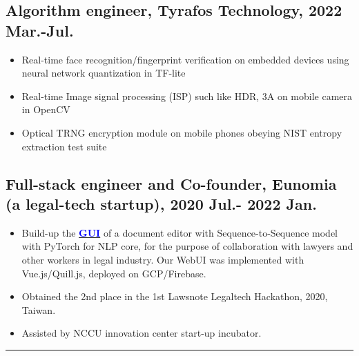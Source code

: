 \documentclass[11pt]{article}
\begin{document}
\begin{multicols*}{2}
\begin{experiencebox}
\vspace{0.3em}

\subsection*{\textbf{Algorithm engineer}, Tyrafos Technology, 2022 Mar.-Jul.}
\begin{itemize}[noitemsep]
    \item Real-time face recognition/fingerprint verification on embedded devices using neural network quantization in TF-lite
    \item Real-time Image signal processing (ISP) such like HDR, 3A on mobile camera in OpenCV
    \item Optical TRNG encryption module on mobile phones obeying NIST entropy extraction test suite
\end{itemize}

\vspace{0.3em}

\subsection*{Full-stack engineer and Co-founder, Eunomia (a legal-tech startup), 2020 Jul.- 2022 Jan.}
\begin{itemize}[noitemsep]
    \item Build-up the \href{https://github.com/Kuo-TingKai/Eunomia}{\textbf{\textcolor{blue}{GUI}}} of a document editor with Sequence-to-Sequence model with PyTorch for NLP core, for the purpose of collaboration with lawyers and other workers in legal industry. Our WebUI was implemented with Vue.js/Quill.js, deployed on GCP/Firebase.
    \item Obtained the 2nd place in the 1st Lawsnote Legaltech Hackathon, 2020, Taiwan.
    \item Assisted by NCCU innovation center start-up incubator.
\end{itemize}
\end{experiencebox}

\hrule

\begin{skillbox}

\end{skillbox}
\end{multicols*}
\end{document}
